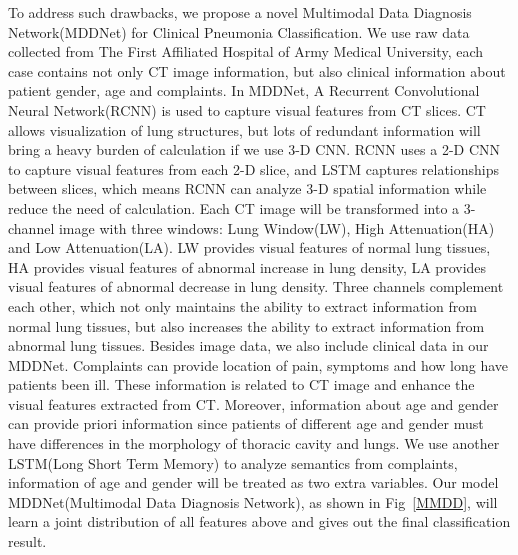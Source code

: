 To address such drawbacks, we propose a novel Multimodal Data Diagnosis Network(MDDNet) for Clinical Pneumonia Classification. We use raw data collected from The First Affiliated Hospital of Army Medical University, each case contains not only CT image information, but also clinical information about patient gender, age and complaints. 
In MDDNet, A Recurrent Convolutional Neural Network(RCNN) is used to capture visual features from CT slices. CT allows visualization of lung structures, but lots of redundant information will bring a heavy burden of calculation if we use 3-D CNN. RCNN uses a 2-D CNN to capture visual features from each 2-D slice, and LSTM captures relationships between slices, which means RCNN can analyze 3-D spatial information while reduce the need of calculation. Each CT image will be transformed into a 3-channel image with three windows: Lung Window(LW), High Attenuation(HA) and Low Attenuation(LA). LW provides visual features of normal lung tissues, HA provides visual features of abnormal increase in lung density, LA provides visual features of abnormal decrease in lung density. Three channels complement each other, which not only maintains the ability to extract information from normal lung tissues, but also increases the ability to extract information from abnormal lung tissues.
Besides image data, we also include clinical data in our MDDNet. Complaints can provide location of pain, symptoms and how long have patients been ill. These information is related to CT image and enhance the visual features extracted from CT. Moreover, information about age and gender can provide priori information since patients of different age and gender must have differences in the morphology of thoracic cavity and lungs. We use another LSTM(Long Short Term Memory) to analyze semantics from complaints, information of age and gender will be treated as two extra variables. Our model MDDNet(Multimodal Data Diagnosis Network), as shown in Fig~\ref{MMDD}, will learn a joint distribution of all features above and gives out the final classification result.